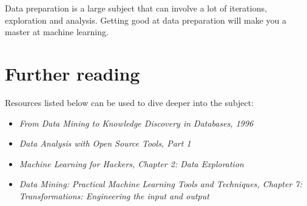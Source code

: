 \documentclass[11pt]{article}
\begin{document}
    Data preparation is a large subject that can involve a lot of iterations, exploration and analysis.
    Getting good at data preparation will make you a master at machine learning.

    \section{Further reading} \label{sec:resources}

    Resources listed below can be used to dive deeper into the subject:

    \begin{itemize}

        \item \textit{From Data Mining to Knowledge Discovery in Databases, 1996}\cite{Fayyad1996}

        \item \textit{Data Analysis with Open Source Tools, Part 1}\cite{Janert2010}

        \item \textit{Machine Learning for Hackers, Chapter 2: Data Exploration}\cite{Conway2012}

        \item \textit{Data Mining: Practical Machine Learning Tools and Techniques, Chapter 7: Transformations: Engineering the input and output}\cite{WittenH.IanFrankEibe2011}

    \end{itemize}

    
    
\end{document}
